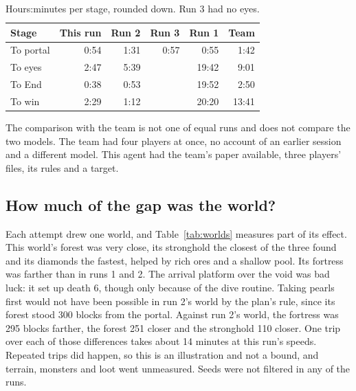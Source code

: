 \documentclass[11pt,a4paper]{article}
\begin{document}
\begin{table}[t]
  \caption{Hours:minutes per stage, rounded down. Run 3 had no eyes.}
  \label{tab:stages}
  \small
  \begin{tabularx}{\textwidth}{@{}Xrrrrr@{}}
    \toprule
    \textbf{Stage} & \textbf{This run} & \textbf{Run 2} & \textbf{Run 3} & \textbf{Run 1} & \textbf{Team} \\
    \midrule
    To portal & 0:54 & 1:31 & 0:57 & 0:55 & 1:42 \\
    To eyes & 2:47 & 5:39 & & 19:42 & 9:01 \\
    To End & 0:38 & 0:53 & & 19:52 & 2:50 \\
    To win & 2:29 & 1:12 & & 20:20 & 13:41 \\
    \bottomrule
  \end{tabularx}
\end{table}

The comparison with the team is not one of equal runs and does not compare the two models. The team had four players at once, no account of an earlier session and a different model. This agent had the team's paper available, three players' files, its rules and a target.

\subsection{How much of the gap was the world?}
\label{sec:worlds}

Each attempt drew one world, and Table~\ref{tab:worlds} measures part of its effect. This world's forest was very close, its stronghold the closest of the three found and its diamonds the fastest, helped by rich ores and a shallow pool. Its fortress was farther than in runs 1 and 2. The arrival platform over the void was bad luck: it set up death 6, though only because of the dive routine. Taking pearls first would not have been possible in run 2's world by the plan's rule, since its forest stood 300 blocks from the portal. Against run 2's world, the fortress was 295 blocks farther, the forest 251 closer and the stronghold 110 closer. One trip over each of those differences takes about 14 minutes at this run's speeds. Repeated trips did happen, so this is an illustration and not a bound, and terrain, monsters and loot went unmeasured. Seeds were not filtered in any of the runs.
\end{document}
